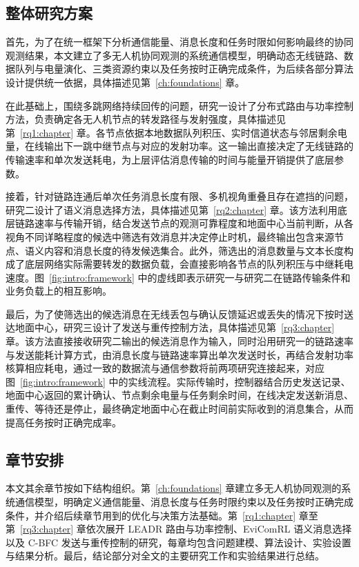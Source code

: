 \subsection{整体研究方案}

首先，为了在统一框架下分析通信能量、消息长度和任务时限如何影响最终的协同观测结果，本文建立了多无人机协同观测的系统通信模型，明确动态无线链路、数据队列与电量演化、三类资源约束以及任务按时正确完成条件，为后续各部分算法设计提供统一依据，具体描述见第~\ref{ch:foundations} 章。

在此基础上，围绕多跳网络持续回传的问题，研究一设计了分布式路由与功率控制方法，负责确定各无人机节点的转发路径与发射强度，具体描述见第~\ref{rq1:chapter} 章。各节点依据本地数据队列积压、实时信道状态与邻居剩余电量，在线输出下一跳中继节点与对应的发射功率。这一输出直接决定了无线链路的传输速率和单次发送耗电，为上层评估消息传输的时间与能量开销提供了底层参数。

接着，针对链路连通后单次任务消息长度有限、多机视角重叠且存在遮挡的问题，研究二设计了语义消息选择方法，具体描述见第~\ref{rq2:chapter} 章。该方法利用底层链路速率与传输开销，结合发送节点的观测可靠程度和地面中心当前判断，从各视角不同详略程度的候选中筛选有效消息并决定停止时机，最终输出包含来源节点、语义内容和消息长度的待发候选集合。此外，筛选出的消息数量与文本长度构成了底层网络实际需要转发的数据负载，会直接影响各节点的队列积压与中继耗电速度。图~\ref{fig:intro:framework} 中的虚线即表示研究一与研究二在链路传输条件和业务负载上的相互影响。

最后，为了使筛选出的候选消息在无线丢包与确认反馈延迟或丢失的情况下按时送达地面中心，研究三设计了发送与重传控制方法，具体描述见第~\ref{rq3:chapter} 章。该方法直接接收研究二输出的候选消息作为输入，同时沿用研究一的链路速率与发送能耗计算方式，由消息长度与链路速率算出单次发送时长，再结合发射功率核算相应耗电，通过一致的数据流与通信参数将前两项研究连接起来，对应图~\ref{fig:intro:framework} 中的实线流程。实际传输时，控制器结合历史发送记录、地面中心返回的累计确认、节点剩余电量与任务剩余时间，在线决定发送新消息、重传、等待还是停止，最终确定地面中心在截止时间前实际收到的消息集合，从而提高任务按时正确完成率。

\FloatBarrier
\subsection{章节安排}

本文其余章节按如下结构组织。第~\ref{ch:foundations} 章建立多无人机协同观测的系统通信模型，明确定义通信能量、消息长度与任务时限约束以及任务按时正确完成条件，并介绍后续章节用到的优化与决策方法基础。第~\ref{rq1:chapter} 章至第~\ref{rq3:chapter} 章依次展开 LEADR 路由与功率控制、EviComRL 语义消息选择以及 C-BFC 发送与重传控制的研究，每章均包含问题建模、算法设计、实验设置与结果分析。最后，结论部分对全文的主要研究工作和实验结果进行总结。